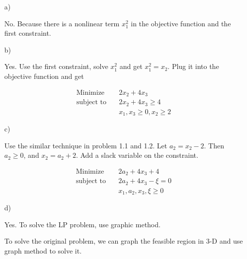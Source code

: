 \documentclass[12pt]{article}
\begin{document}
\begin{enumerate}
\item[a)]

No. Because there is a nonlinear term $x_1^2$ in the objective function and the first constraint.

\item[b)]

Yes. Use the first constraint, solve $x_1^2$ and get $x_1^2 = x_2$. Plug it into the objective function and get 

\begin{equation*}
\begin{aligned}
\text{Minimize} \quad & 2x_2 + 4x_3 \\
\text{subject\  to} \quad & 2x_2 + 4x_3 \geqslant 4 \\
& x_1, x_3 \geqslant 0, x_2 \geqslant 2
\end{aligned}
\end{equation*}


\item[c)]

Use the similar technique in problem 1.1 and 1.2. Let $a_2 = x_2 - 2$. Then $a_2 \geqslant 0$, and $x_2 = a_2 + 2$. Add a slack variable on the constraint. 

\begin{equation*}
\begin{aligned}
\text{Minimize} \quad & 2a_2 + 4x_3 + 4 \\
\text{subject\  to} \quad & 2a_2 + 4x_3 - \xi = 0 \\
& x_1, a_2, x_3, \xi \geqslant 0
\end{aligned}
\end{equation*}

\item[d)]

Yes. To solve the LP problem, use graphic method. 










To solve the original problem, we can graph the feasible region in 3-D and use graph method to solve it.


\end{enumerate}
\end{document}
